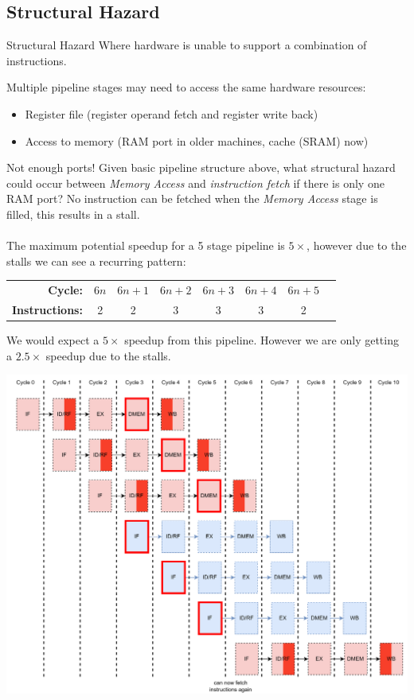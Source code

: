 \subsection{Structural Hazard}
\begin{definitionbox}{Structural Hazard}
	Where hardware is unable to support a combination of instructions.
\end{definitionbox}
Multiple pipeline stages may need to access the same hardware resources:
\begin{itemize}
	\item Register file (register operand fetch and register write back)
	\item Access to memory (RAM port in older machines, cache (SRAM) now)
\end{itemize}
\begin{examplebox}{Not enough ports!}
	Given basic pipeline structure above, what structural hazard could occur between \textit{Memory Access} and \textit{instruction fetch} if there is only one RAM port?
	\tcblower
	No instruction can be fetched when the \textit{Memory Access} stage is filled, this results in a stall.
	\\
	\\ The maximum potential speedup for a 5 stage pipeline is $5\times$, however due to the stalls we can see a recurring pattern:
	\begin{center}
		\begin{tabular}{r c c c c c c c}
			\textbf{Cycle:}        & $6n$ & $6n+1$ & $6n+2$ & $6n+3$ & $6n+4$ & $6n+5$ \\
			\textbf{Instructions:} & 2    & 2      & 3      & 3      & 3      & 2      \\
		\end{tabular}
	\end{center}
	We would expect a $5\times$ speedup from this pipeline. However we are only getting a $2.5\times$ speedup due to the stalls.

	\begin{center}
		\includegraphics[width=\textwidth]{pipelining/images/example_structural_hazard.drawio.png}
	\end{center}
\end{examplebox}

